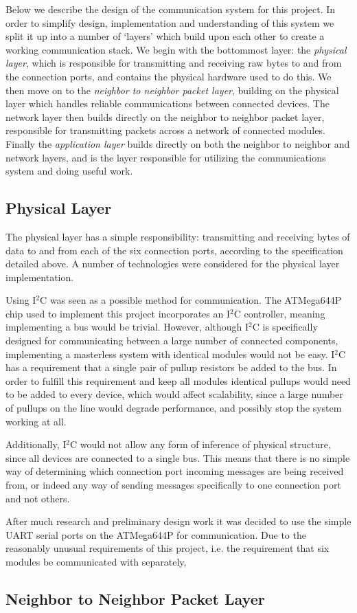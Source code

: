 Below we describe the design of the communication system for this project. In order to simplify design, implementation and understanding of this system we split it up into a number of `layers' which build upon each other to create a working communication stack. We begin with the bottommost layer: the \emph{physical layer}, which is responsible for transmitting and receiving raw bytes to and from the connection ports, and contains the physical hardware used to do this. We then move on to the \emph{neighbor to neighbor packet layer}, building on the physical layer which handles reliable communications between connected devices. The network layer then builds directly on the neighbor to neighbor packet layer, responsible for transmitting packets across a network of connected modules. Finally the \emph{application layer} builds directly on both the neighbor to neighbor and network layers, and is the layer responsible for utilizing the communications system and doing useful work.

\subsection{Physical Layer}

The physical layer has a simple responsibility: transmitting and receiving bytes of data to and from each of the six connection ports, according to the specification detailed above. A number of technologies were considered for the physical layer implementation.

Using I$^{2}$C was seen as a possible method for communication. The ATMega644P chip used to implement this project incorporates an I$^{2}$C controller, meaning implementing a bus would be trivial. However, although I$^{2}$C is specifically designed for communicating between a large number of connected components, implementing a masterless system with identical modules would not be easy. I$^{2}$C has a requirement that a single pair of pullup resistors be added to the bus. In order to fulfill this requirement and keep all modules identical pullups would need to be added to every device, which would affect scalability, since a large number of pullups on the line would degrade performance, and possibly stop the system working at all.

Additionally, I$^{2}$C would not allow any form of inference of physical structure, since all devices are connected to a single bus. This means that there is no simple way of determining which connection port incoming messages are being received from, or indeed any way of sending messages specifically to one connection port and not others.

After much research and preliminary design work it was decided to use the simple UART serial ports on the ATMega644P for communication. Due to the reasonably unusual requirements of this project, i.e. the requirement that six modules be communicated with separately,

\subsection{Neighbor to Neighbor Packet Layer}